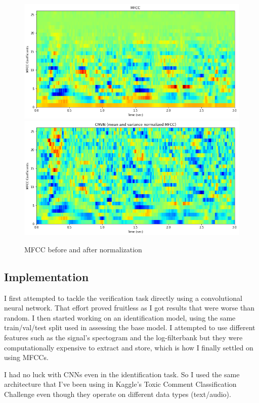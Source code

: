\documentclass{article}
\begin{document}
\begin{figure}[H]
    \includegraphics[scale=.5]{images/mfcc.png}
    \includegraphics[scale=.5]{images/cmvn.png}
    \caption{MFCC before and after normalization}
    \label{fig:normalizatin}
\end{figure}

\subsection{Implementation} \label{implementation}
I first attempted to tackle the verification task directly using a convolutional neural network. That effort proved fruitless as I got results that were worse than random. I then started working on an identification model, using the same train/val/test split used in assessing the base model. I attempted to use different features such as the signal's spectogram and the log-filterbank but they were computationally expensive to extract and store, which is how I finally settled on using MFCCs.

I had no luck with CNNs even in the identification task. So I used the same architecture that I've been using in Kaggle's Toxic Comment Classification Challenge even though they operate on different data types (text/audio).
\end{document}
